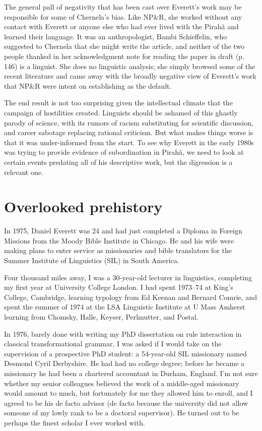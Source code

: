 \documentclass[output=paper,colorlinks,citecolor=brown
]{langscibook}
\begin{document}
The general pall of negativity that has been cast over Everett's work
may be responsible for some of Chernela's bias. Like NP\&R, she worked
without any contact with Everett or anyone else who had ever lived with
the Pirah{\~a} and learned their language. It was an anthropologist,
Bambi Schieffelin, who suggested to Chernela that she might write the
article, and neither of the two people thanked in her acknowledgment
note for reading the paper in draft (p.\,146) is a linguist. She does
no linguistic analysis; she simply browsed some of the recent
literature and came away with the broadly negative view of Everett's
work that NP\&R were intent on establishing as the default.

The end result is not too surprising given the intellectual climate
that the campaign of hostilities created. Linguists should be ashamed of
this ghastly parody of science, with its rumors of racism substituting
for scientific discussion, and career sabotage replacing rational
criticism. But what makes things worse is that it was under-informed
from the start. To see why Everett in the early 1980s was trying to
provide evidence of subordination in Pirah{\~a}, we need to look at
certain events predating all of his descriptive work, but the
digression is a relevant one.

\section{Overlooked prehistory}\label{prehistory}

In 1975, Daniel Everett was 24 and had just completed a Diploma
in Foreign Missions from the Moody Bible Institute in Chicago. He and
his wife were making plans to enter service as missionaries and bible
translators for the Summer Institute of Linguistics (SIL) in South
America.

Four thousand miles away, I was a 30-year-old lecturer in linguistics,
completing my first year at University College London. I had spent
1973--74 at King's College, Cambridge, learning typology from Ed
Keenan and Bernard Comrie, and spent the summer of 1974 at the LSA
Linguistic Institute at U Mass Amherst learning from Chomsky, Halle,
Keyser, Perlmutter, and Postal.

In 1976, barely done with writing my PhD dissertation on rule
interaction in classical transformational grammar, I was asked if
I would take on the supervision of a prospective PhD student: a
54-year-old SIL missionary named Desmond Cyril Derbyshire. He had had
no college degree; before he became a missionary he had been a
chartered accountant in Durham, England. I'm not sure whether my
senior colleagues believed the work of a middle-aged missionary would
amount to much, but fortunately for me they allowed him to enroll,
and I agreed to be his de facto advisor (de facto because the
university did not allow someone of my lowly rank to be a doctoral
supervisor). He turned out to be perhaps the finest scholar I ever
worked with.
\end{document}
